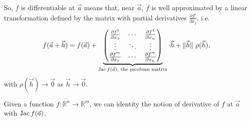 
So, $f$ is differentiable at  $\vec a$ means that, near $\vec a$, $f$ is well approximated by a linear transformation defined by the matrix with partial derivatives $\frac{\partial f^i}{\partial x_j}$, i.e. \[
	f(\vec a + \vec h) = f(\vec a) + 
	\underbrace{
	\begin{pmatrix}
		\frac{\partial f^1}{\partial x_1} & \cdots & \frac{\partial f^1}{\partial x_n}\\
		\vdots & \ddots & \vdots \\
		\frac{\partial f^m}{\partial x_1} & \cdots & \frac{\partial f^m}{\partial x_n}\\
\end{pmatrix}}_{\text{$\operatorname{Jac} f(\vec a)$, the jacobian matrix}}
	\cdot \vec h + \lVert \vec h \rVert \  \rho(\vec h),
	\]
with $\rho(\vec h) \to \vec 0$ as $\vec h \to \vec 0$.

Given a function $f: \mathbb{R}^n \to \mathbb{R}^m$, we can identity the notion of derivative of $f$ at $\vec a$ with $\operatorname{Jac} f(\vec a)$.
